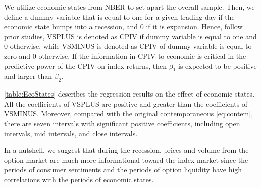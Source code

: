 We utilize economic states from NBER to set apart the overall sample. Then, we define a dummy variable that is equal to one for a given trading day if the economic state bumps into a recession, and 0 if it is expansion. Hence, follow prior studies, VSPLUS is denoted as CPIV if dummy variable is equal to one and 0 otherwise, while VSMINUS is denoted as CPIV of dummy variable is equal to zero and 0 otherwise. If the information in CPIV to economic is critical in the predictive power of the CPIV on index returns, then $\beta _{1}$ is expected to be positive and larger than $\beta _{2}$.

\autoref{table:EcoStates} describes the regression results on the effect of economic states. All the coefficients of VSPLUS are positive and greater than the coefficients of VSMINUS. Moreover, compared with the original contemporaneous \autoref{eq:contem}, there are seven intervals with significant positive coefficients, including open intervals, mid intervals, and close intervals. 

In a nutshell, we suggest that during the recession, prices and volume from the option market are much more informational toward the index market since the periods of consumer sentiments and the periods of option liquidity have high correlations with the periods of economic states.  












